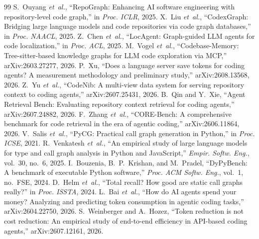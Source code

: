 \documentclass[conference]{IEEEtran}
\begin{document}

\begin{thebibliography}{99}
 S.~Ouyang \emph{et~al.}, ``RepoGraph: Enhancing AI software engineering with repository-level code graph,'' in \emph{Proc. ICLR}, 2025.
 X.~Liu \emph{et~al.}, ``CodexGraph: Bridging large language models and code repositories via code graph databases,'' in \emph{Proc. NAACL}, 2025.
 Z.~Chen \emph{et~al.}, ``LocAgent: Graph-guided LLM agents for code localization,'' in \emph{Proc. ACL}, 2025.
 M.~Vogel \emph{et~al.}, ``Codebase-Memory: Tree-sitter-based knowledge graphs for LLM code exploration via MCP,'' arXiv:2603.27277, 2026.
 P.~Xu, ``Does a language server save tokens for coding agents? A measurement methodology and preliminary study,'' arXiv:2608.13568, 2026.
 Z.~Yu \emph{et~al.}, ``CodeNib: A multi-view data system for serving repository context to coding agents,'' arXiv:2607.25431, 2026.
 B.~Qin and Y.~Xie, ``Agent Retrieval Bench: Evaluating repository context retrieval for coding agents,'' arXiv:2607.24882, 2026.
 F.~Zhang \emph{et~al.}, ``CORE-Bench: A comprehensive benchmark for code retrieval in the era of agentic coding,'' arXiv:2606.11864, 2026.
 V.~Salis \emph{et~al.}, ``PyCG: Practical call graph generation in Python,'' in \emph{Proc. ICSE}, 2021.
 R.~Venkatesh \emph{et~al.}, ``An empirical study of large language models for type and call graph analysis in Python and JavaScript,'' \emph{Empir. Softw. Eng.}, vol.~30, no.~6, 2025.
 I.~Bouzenia, B.~P.~Krishan, and M.~Pradel, ``DyPyBench: A benchmark of executable Python software,'' \emph{Proc. ACM Softw. Eng.}, vol.~1, no.~FSE, 2024.
 D.~Helm \emph{et~al.}, ``Total recall? How good are static call graphs really?'' in \emph{Proc. ISSTA}, 2024.
 L.~Bai \emph{et~al.}, ``How do AI agents spend your money? Analyzing and predicting token consumption in agentic coding tasks,'' arXiv:2604.22750, 2026.
 S.~Weinberger and A.~Hozez, ``Token reduction is not cost reduction: An empirical study of end-to-end efficiency in API-based coding agents,'' arXiv:2607.12161, 2026.
\end{thebibliography}
\end{document}
